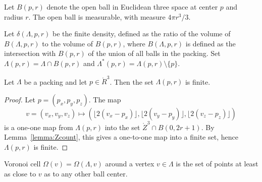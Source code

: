 



  Let $B(p,r)$ denote the open ball in
Euclidean three space at center $p$ and radius $r$.  The open ball
is measurable, with measure $4\pi r^3/3$.


Let $\delta(\Lambda,p,r)$ be the finite density, defined as the
ratio of the volume of $B(\Lambda,p,r)$ to the volume of $B(p,r)$,
where $B(\Lambda,p,r)$ is defined as the intersection with
$B(p,r)$ of the union of all balls in the packing. Set
$\Lambda(p,r) = \Lambda \cap
B(p,r)$ and $\Lambda^*(p,r) = \Lambda(p,r)\setminus \{p\}$.

\begin{lemma}
\label{lemma:Lambda-finite}
Let $\Lambda$ be a packing and let $p\in\ring{R}^3$.
Then the set $\Lambda(p,r)$ is finite.
\end{lemma}

\begin{proof}  Let $p = (p_x,p_y,p_z)$. The map
$$v=(v_x,v_y,v_z)\mapsto (\lfloor 2(v_x-p_x)
\rfloor, \lfloor 2(v_y-p_y) \rfloor, \lfloor 2(v_z-p_z) \rfloor)$$
is a one-one map from $\Lambda(p,r)$ into the set $\ring{Z}^3\cap B(0,2
r
 + 1)$.  By Lemma~\ref{lemma:Zcount}, this gives a one-to-one map
 into a finite set, hence $\Lambda(p,r)$ is finite.
\end{proof}


\begin{definition}\label{def:voronoi}
 Voronoi cell
$\Omega(v)=\Omega(\Lambda,v)$
 around a
vertex $v\in \Lambda$ is the set of points at least as close to $v$ as to
any other ball center. 
\end{definition}


